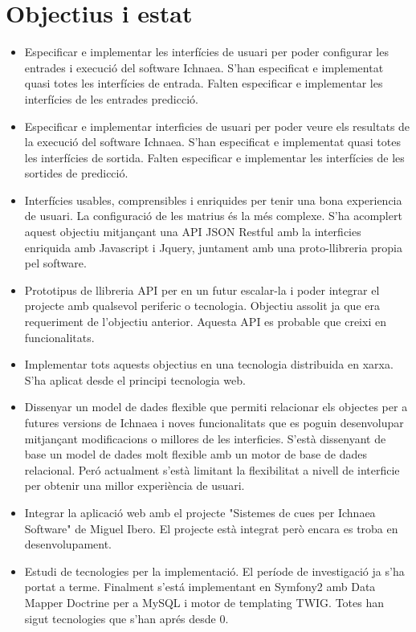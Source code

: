 \section{Objectius i estat}
\begin{itemize}
\item Especificar e implementar les interf\'{i}cies de usuari per poder configurar les entrades i execuci\'{o} del software Ichnaea. S'han especificat e implementat quasi totes les interf\'{i}cies de entrada. Falten especificar e implementar les interf\'{i}cies de les entrades predicci\'{o}.
\item Especificar e implementar interficies de usuari per poder veure els resultats de la execuci\'{o} del software Ichnaea. S'han especificat e implementat quasi totes les interf\'{i}cies de sortida. Falten especificar e implementar les interf\'{i}cies de les sortides de predicci\'{o}.
\item Interf\'{i}cies usables, comprensibles i enriquides per tenir una bona experiencia de usuari. La configuraci\'{o} de les matrius \'{e}s la m\'{e}s complexe. S'ha acomplert aquest objectiu mitjançant una API JSON Restful amb la interficies enriquida amb Javascript i Jquery, juntament amb una proto-llibreria propia pel software.
\item Prototipus de llibreria API per en un futur escalar-la i poder integrar el projecte amb qualsevol periferic o tecnologia. Objectiu assolit ja que era requeriment de l'objectiu anterior. Aquesta API es probable que creixi en funcionalitats.
\item Implementar tots aquests objectius en una tecnologia distribuida en xarxa. S'ha aplicat desde el principi tecnologia web.
\item Dissenyar un model de dades flexible que permiti relacionar els objectes per a futures versions de Ichnaea i noves funcionalitats que es poguin desenvolupar mitjançant modificacions o millores de les interficies. S'est\`{a} dissenyant de base un model de dades molt flexible amb un motor de base de dades relacional. Per\'{o} actualment s'est\`{a} limitant la flexibilitat a nivell de interficie per obtenir una millor experi\`{e}ncia de usuari.
\item Integrar la aplicaci\'{o} web amb el projecte "Sistemes de cues per Ichnaea Software" de Miguel Ibero. El projecte est\`{a} integrat per\`{o} encara es troba en desenvolupament. 
\item Estudi de tecnologies per la implementaci\'{o}. El per\'{i}ode de investigaci\'{o} ja s'ha portat a terme. Finalment s'est\'{a} implementant en Symfony2 amb Data Mapper Doctrine per a MySQL i motor de templating TWIG. Totes han sigut tecnologies que s'han apr\'{e}s desde 0.

\end{itemize}

